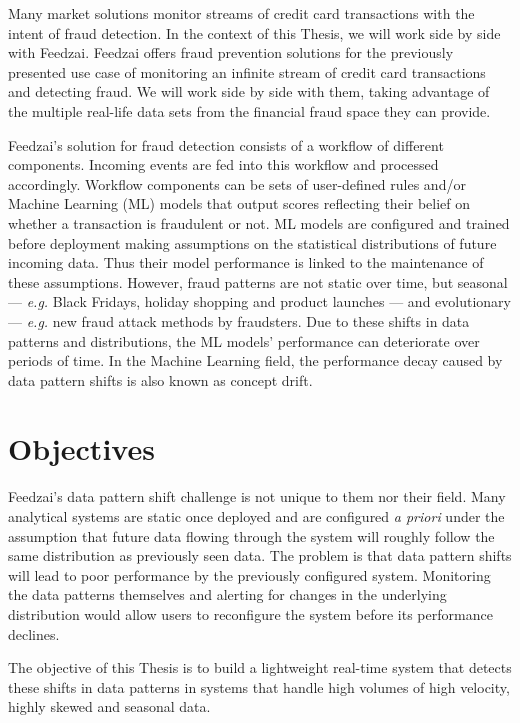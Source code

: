 Many market solutions monitor streams of credit card transactions with the intent of fraud detection. In the context of this Thesis, we will work side by side with Feedzai. Feedzai offers fraud prevention solutions for the previously presented use case of monitoring an infinite stream of credit card transactions and detecting fraud. We will work side by side with them, taking advantage of the multiple real-life data sets from the financial fraud space they can provide. 

Feedzai's solution for fraud detection consists of a workflow of different components. Incoming events are fed into this workflow and processed accordingly. Workflow components can be sets of user-defined rules and/or Machine Learning (ML) models that output scores reflecting their belief on whether a transaction is fraudulent or not. ML models are configured and trained before deployment making assumptions on the statistical distributions of future incoming data. Thus their model performance is linked to the maintenance of these assumptions. However, fraud patterns are not static over time, but seasonal --- \textit{e.g.} Black Fridays, holiday shopping and product launches --- and evolutionary --- \textit{e.g.} new fraud attack methods by fraudsters. Due to these shifts in data patterns and distributions, the ML models' performance can deteriorate over periods of time. In the Machine Learning field, the performance decay caused by data pattern shifts is also known as concept drift. %

\section{Objectives} \label{sec:objectives}
Feedzai's data pattern shift challenge is not unique to them nor their field. Many analytical systems are static once deployed and are configured \textit{a priori} under the assumption that future data flowing through the system will roughly follow the same distribution as previously seen data.
The problem is that data pattern shifts will lead to poor performance by the previously configured system. Monitoring the data patterns themselves and alerting for changes in the underlying distribution would allow users to reconfigure the system before its performance declines.

The objective of this Thesis is to build a lightweight real-time system that detects these shifts in data patterns in systems that handle high volumes of high velocity, highly skewed and seasonal data.

